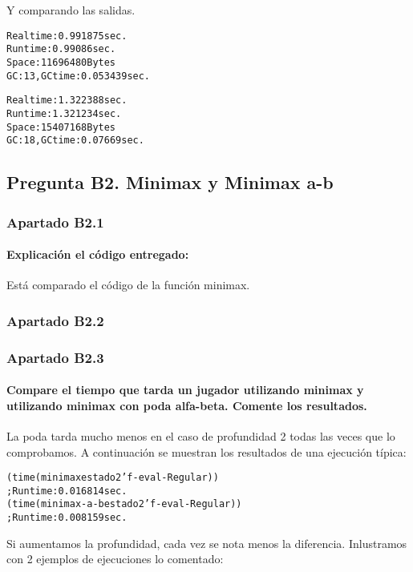 \documentclass[nochap]{apuntes}
\begin{document}
Y comparando las salidas.

\begin{alltt}
Real time: 0.991875 sec.
Run time: 0.99086 sec.
Space: 11696480 Bytes
GC: 13, GC time: 0.053439 sec.

Real time: 1.322388 sec.
Run time: 1.321234 sec.
Space: 15407168 Bytes
GC: 18, GC time: 0.07669 sec.
\end{alltt}

\subsection*{Pregunta B2. Minimax y Minimax a-b}
\subsubsection*{Apartado B2.1}

\paragraph{Explicación el código entregado:}

Está comparado el código de la función minimax.

\subsubsection*{Apartado B2.2}

\subsubsection*{Apartado B2.3}

\paragraph{Compare el tiempo que tarda un jugador utilizando minimax y utilizando minimax con poda alfa-beta. Comente los resultados.}

La poda tarda mucho menos en el caso de profundidad 2 todas las veces que lo comprobamos. A continuación se muestran los resultados de una ejecución típica:
\begin{alltt}
(time (minimax estado 2 'f-eval-Regular)) 
	; Run time: 0.016814 sec.
(time (minimax-a-b estado 2 'f-eval-Regular)) 
	; Run time: 0.008159 sec.
\end{alltt}

Si aumentamos la profundidad, cada vez se nota menos la diferencia. Inlustramos con 2 ejemplos de ejecuciones lo comentado:
\end{document}
